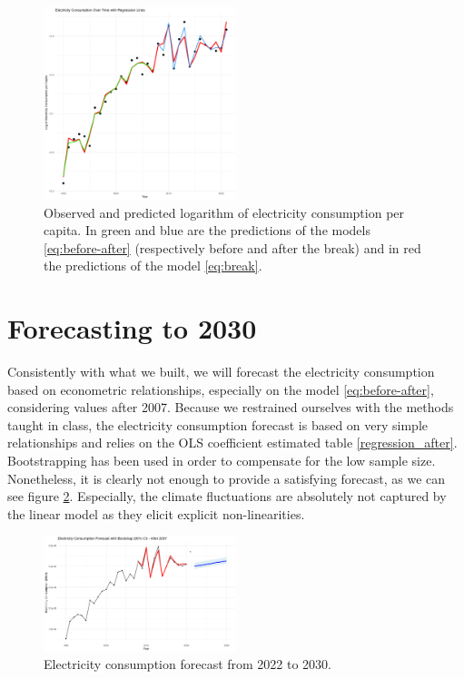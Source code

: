   \begin{figure}[h]
    \centering
      \includegraphics[width=0.5\textwidth]{Images/electricity_consumption_regression.jpeg}
      \caption{Observed and predicted logarithm of electricity consumption per capita. In green and blue are the predictions of the models \eqref{eq:before-after} (respectively before and after the break) and in red the predictions of the model \eqref{eq:break}.}
    \label{fig:regstructural}
  \end{figure}

\section{Forecasting to 2030}
Consistently with what we built, we will forecast the electricity consumption based on econometric relationships, especially on the model \eqref{eq:before-after}, considering values after 2007. Because we restrained ourselves with the methods taught in class, the electricity consumption forecast is based on very simple relationships and relies on the OLS coefficient estimated table \ref{regression_after}. Bootstrapping has been used in order to compensate for the low sample size. Nonetheless, it is clearly not enough to provide a satisfying forecast, as we can see figure \ref{fig:forecast}. Especially, the climate fluctuations are absolutely not captured by the linear model as they elicit explicit non-linearities.

\begin{figure}[h]
    \centering
      \includegraphics[width=0.5\textwidth]{Images/bootstrap_forecast_after.jpeg}
      \caption{Electricity consumption forecast from 2022 to 2030.}
    \label{fig:forecast}
  \end{figure}

